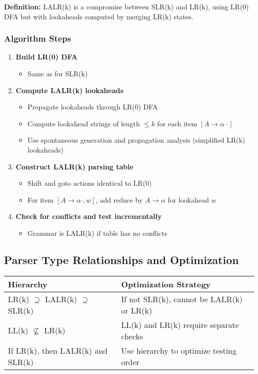 \textbf{Definition:} LALR(k) is a compromise between SLR(k) and LR(k), using LR(0) DFA but with lookaheads computed by merging LR(k) states.

\subsubsection{Algorithm Steps}

\begin{enumerate}
    \item \textbf{Build LR(0) DFA}
    \begin{itemize}
        \item Same as for SLR(k)
    \end{itemize}
    
    \item \textbf{Compute LALR(k) lookaheads}
    \begin{itemize}
        \item Propagate lookaheads through LR(0) DFA
        \item Compute lookahead strings of length $\leq k$ for each item $[A \to \alpha \cdot]$
        \item Use spontaneous generation and propagation analysis (simplified LR(k) lookaheads)
    \end{itemize}
    
    \item \textbf{Construct LALR(k) parsing table}
    \begin{itemize}
        \item Shift and goto actions identical to LR(0)
        \item For item $[A \to \alpha \cdot, w]$, add reduce by $A \to \alpha$ for lookahead $w$
    \end{itemize}
    
    \item \textbf{Check for conflicts and test incrementally}
    \begin{itemize}
        \item Grammar is LALR(k) if table has no conflicts
    \end{itemize}
\end{enumerate}


\subsection{Parser Type Relationships and Optimization}

\begin{center}
\begin{tabular}{|l|l|}
\hline
\textbf{Hierarchy} & \textbf{Optimization Strategy} \\
\hline
LR(k) $\supseteq$ LALR(k) $\supseteq$ SLR(k) & If not SLR(k), cannot be LALR(k) or LR(k) \\
\hline
LL(k) $\not\subseteq$ LR(k) & LL(k) and LR(k) require separate checks \\
\hline
If LR(k), then LALR(k) and SLR(k) & Use hierarchy to optimize testing order \\
\hline
\end{tabular}
\end{center}
